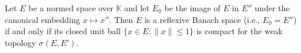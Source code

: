 Let $E$ be a normed space over $\mathbb{K}$ and let $E_0$ be the image of $E$ in $E''$ under the canonical embedding $x \mapsto x''$. Then $E$ is a reflexive Banach space (i.e., $E_0 = E''$) if and only if its closed unit ball $\{x \in E : \|x\| \leq 1\}$ is compact for the weak topology $\sigma(E, E')$.
